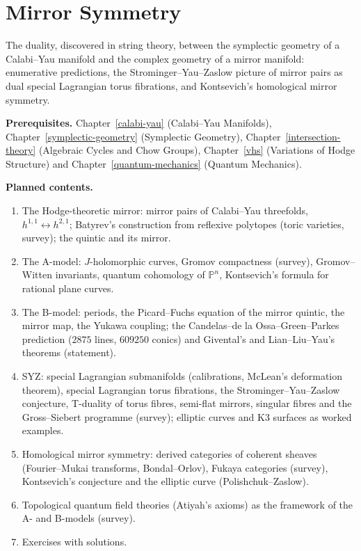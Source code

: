 \chapter{Mirror Symmetry}\label{mirror-symmetry}

The duality, discovered in string theory, between the symplectic geometry of a Calabi--Yau manifold and the complex geometry of a mirror manifold: enumerative predictions, the
Strominger--Yau--Zaslow picture of mirror pairs as dual special Lagrangian torus fibrations, and Kontsevich's homological mirror symmetry.

\noindent\textbf{Prerequisites.} Chapter~\ref{calabi-yau} (Calabi--Yau Manifolds), Chapter~\ref{symplectic-geometry} (Symplectic Geometry), Chapter~\ref{intersection-theory} (Algebraic Cycles and Chow
Groups), Chapter~\ref{vhs} (Variations of Hodge Structure) and Chapter~\ref{quantum-mechanics} (Quantum Mechanics).

\noindent\textbf{Planned contents.}
\begin{enumerate}
\item The Hodge-theoretic mirror: mirror pairs of Calabi--Yau threefolds, $h^{1,1} \leftrightarrow h^{2,1}$; Batyrev's construction from reflexive polytopes (toric varieties, survey); the quintic and its
mirror.
\item The A-model: $J$-holomorphic curves, Gromov compactness (survey), Gromov--Witten invariants, quantum cohomology of $\mathbb{P}^n$, Kontsevich's formula for rational plane curves.
\item The B-model: periods, the Picard--Fuchs equation of the mirror quintic, the mirror map, the Yukawa coupling; the Candelas--de la Ossa--Green--Parkes prediction ($2875$ lines, $609250$ conics) and
Givental's and Lian--Liu--Yau's theorems (statement).
\item SYZ: special Lagrangian submanifolds (calibrations, McLean's deformation theorem), special Lagrangian torus fibrations, the Strominger--Yau--Zaslow conjecture, T-duality of torus fibres,
semi-flat mirrors, singular fibres and the Gross--Siebert programme (survey); elliptic curves and K3 surfaces as worked examples.
\item Homological mirror symmetry: derived categories of coherent sheaves (Fourier--Mukai transforms, Bondal--Orlov), Fukaya categories (survey), Kontsevich's conjecture and the elliptic curve
(Polishchuk--Zaslow).
\item Topological quantum field theories (Atiyah's axioms) as the framework of the A- and B-models (survey).
\item Exercises with solutions.
\end{enumerate}
